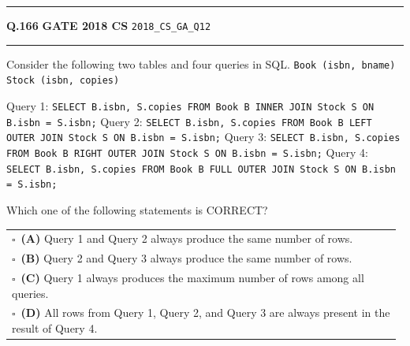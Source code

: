 \documentclass[a4paper,10pt]{article}
\begin{document}
\vspace{6pt}\hrule height 0.35pt\vspace{6pt}
\noindent
\begin{tcolorbox}[
    blanker,
    sidebyside,
    sidebyside align=top,
    lefthand width=0.55\textwidth,
    top=4pt, bottom=4pt, left=0pt, right=0pt,
    middle=16pt,
    underlay={
        \draw[dashed, black!80, line width=0.8pt, dash pattern=on 4pt off 3pt]
            ([xshift=0.55\textwidth+8pt]frame.north west) --
            ([xshift=0.55\textwidth+8pt]frame.south west);
    }
]
\textbf{Q.166}  \hfill {\footnotesize\textbf{GATE 2018 CS} \quad \tiny\texttt{2018\_CS\_GA\_Q12}}
\vspace{2pt}\hrule height 0.3pt\vspace{4pt}

Consider the following two tables and four queries in SQL.
\texttt{Book (isbn, bname)}
\texttt{Stock (isbn, copies)}
\par\medskip
Query 1: \texttt{SELECT B.isbn, S.copies FROM Book B INNER JOIN Stock S ON B.isbn = S.isbn;}
Query 2: \texttt{SELECT B.isbn, S.copies FROM Book B LEFT OUTER JOIN Stock S ON B.isbn = S.isbn;}
Query 3: \texttt{SELECT B.isbn, S.copies FROM Book B RIGHT OUTER JOIN Stock S ON B.isbn = S.isbn;}
Query 4: \texttt{SELECT B.isbn, S.copies FROM Book B FULL OUTER JOIN Stock S ON B.isbn = S.isbn;}
\par\medskip
Which one of the following statements is CORRECT?

\par\vspace{6pt}\noindent
\begin{tabular}{@{}p{0.98\linewidth}@{}}
$\square$\ \textbf{(A)} Query 1 and Query 2 always produce the same number of rows. \\
\addlinespace[3pt]
$\square$\ \textbf{(B)} Query 2 and Query 3 always produce the same number of rows. \\
\addlinespace[3pt]
$\square$\ \textbf{(C)} Query 1 always produces the maximum number of rows among all queries. \\
\addlinespace[3pt]
$\square$\ \textbf{(D)} All rows from Query 1, Query 2, and Query 3 are always present in the result of Query 4.
\end{tabular}

\tcblower


\end{tcolorbox}
\end{document}
